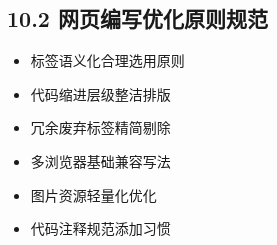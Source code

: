 \subsection{10.2 网页编写优化原则规范}
\begin{itemize}[leftmargin=*]
\item 标签语义化合理选用原则
\item 代码缩进层级整洁排版
\item 冗余废弃标签精简剔除
\item 多浏览器基础兼容写法
\item 图片资源轻量化优化
\item 代码注释规范添加习惯
\end{itemize}
